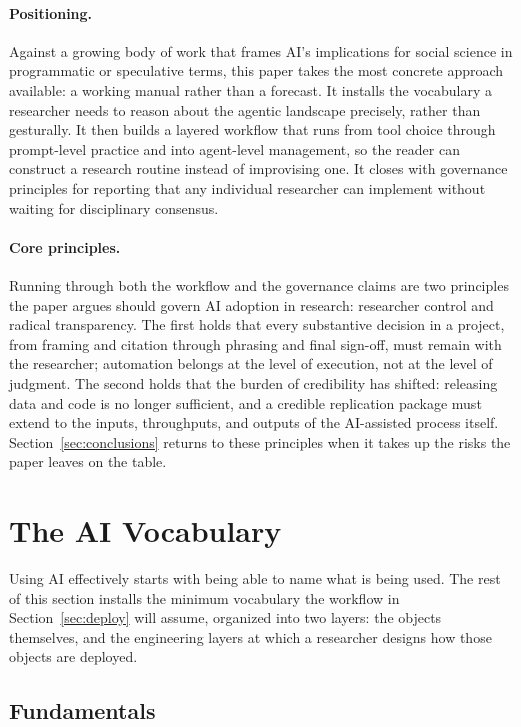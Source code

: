 \documentclass[11pt]{article}
\begin{document}
\paragraph{Positioning.}
Against a growing body of work that frames AI's implications for social science in programmatic or speculative terms, this paper takes the most concrete approach available: a working manual rather than a forecast. It installs the vocabulary a researcher needs to reason about the agentic landscape precisely, rather than gesturally. It then builds a layered workflow that runs from tool choice through prompt-level practice and into agent-level management, so the reader can construct a research routine instead of improvising one. It closes with governance principles for reporting that any individual researcher can implement without waiting for disciplinary consensus.

\paragraph{Core principles.}
Running through both the workflow and the governance claims are two principles the paper argues should govern AI adoption in research: researcher control and radical transparency. The first holds that every substantive decision in a project, from framing and citation through phrasing and final sign-off, must remain with the researcher; automation belongs at the level of execution, not at the level of judgment. The second holds that the burden of credibility has shifted: releasing data and code is no longer sufficient, and a credible replication package must extend to the inputs, throughputs, and outputs of the AI-assisted process itself. Section~\ref{sec:conclusions} returns to these principles when it takes up the risks the paper leaves on the table.

\section{The AI Vocabulary}
\label{sec:vocabulary}

Using AI effectively starts with being able to name what is being used. The rest of this section installs the minimum vocabulary the workflow in Section~\ref{sec:deploy} will assume, organized into two layers: the objects themselves, and the engineering layers at which a researcher designs how those objects are deployed.

\subsection{Fundamentals}
\label{sec:vocab-fundamentals}
\end{document}
